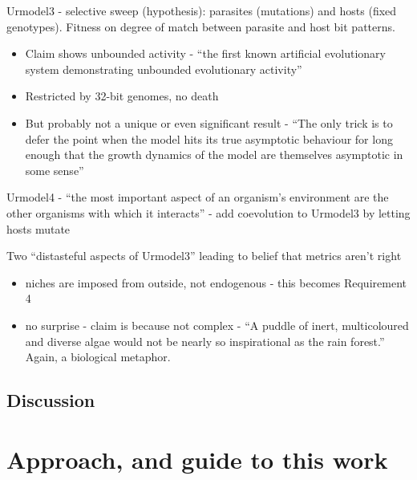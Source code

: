 Urmodel3 - selective sweep (hypothesis): parasites (mutations) and
hosts (fixed genotypes). Fitness on degree of match between parasite
and host bit patterns.


\begin{itemize}
	\item
	
	Claim shows unbounded activity - ``the first known artificial
	evolutionary system demonstrating unbounded evolutionary activity''
	
	\item
	
	Restricted by 32-bit genomes, no death
	
	\item
	
	But probably not a unique or even significant result - ``The only
	trick is to defer the point when the model hits its true asymptotic
	behaviour for long enough that the growth dynamics of the model are
	themselves asymptotic in some sense''
	
\end{itemize}


Urmodel4 - ``the most important aspect of an organism's environment
are the other organisms with which it interacts'' - add coevolution to
Urmodel3 by letting hosts mutate

Two ``distasteful aspects of Urmodel3'' leading to belief that metrics
aren't right


\begin{itemize}
	\item
	
	niches are imposed from outside, not endogenous - this becomes
	Requirement 4
	
	\item
	
	no surprise - claim is because not complex - ``A puddle of inert,
	multicoloured and diverse algae would not be nearly so inspirational
	as the rain forest.'' Again, a biological metaphor.
	
\end{itemize}



\subsection{Discussion}

\section{Approach, and guide to this work}

